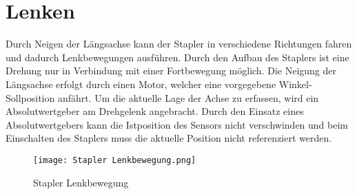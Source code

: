 \section{Lenken}\label{sec:Lenken}
Durch Neigen der Längsachse kann der Stapler in verschiedene Richtungen fahren und dadurch Lenkbewegungen ausführen. Durch den Aufbau des Staplers ist eine Drehung nur in Verbindung mit einer Fortbewegung möglich. Die Neigung der Längsachse erfolgt durch einen Motor, welcher eine vorgegebene Winkel- Sollposition anfährt. Um die aktuelle Lage der Achse zu erfassen, wird ein Absolutwertgeber am Drehgelenk angebracht. Durch den Einsatz eines Absolutwertgebers kann die Istposition des Sensors nicht verschwinden und beim Einschalten des Staplers muss die aktuelle Position nicht referenziert werden.
\begin{figure}[h]
	\centering
	\texttt{[image: Stapler Lenkbewegung.png]}
	\caption{Stapler Lenkbewegung}
	\label{fig: Stapler Lenkbewegung}
\end{figure}